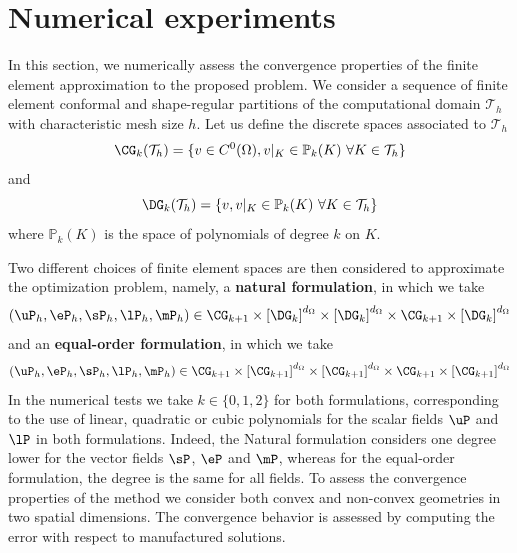\section{Numerical experiments}

In this section, we numerically assess the convergence properties of the finite element approximation to the proposed problem. We consider a sequence of finite element conformal and shape-regular partitions of the computational domain $\mathcal{T}_h$ with characteristic mesh size $h$. 
Let us define the discrete spaces associated to $\mathcal{T}_h$
$$
\CG_{k}(\mathcal{T}_h) = \{v \in C^0(\Omega), v|_K \in \mathbb{P}_k(K)~\forall K \in \mathcal{T}_h\}
$$
and 
$$
\DG_{k}(\mathcal{T}_h) = \{v, v|_K \in \mathbb{P}_k(K)~\forall K \in \mathcal{T}_h\}
$$
where $\mathbb{P}_k(K)$ is the space of polynomials of degree $k$ on $K$.

Two different choices of finite element spaces are then considered to approximate
the optimization problem, namely, a \textbf{natural formulation}, in which we take 
\begin{equation}\label{eq:natural_func_spaces}
	\left(\uP_{h}, \eP_{h}, \sP_{h}, \lP_{h}, \mP_{h}\right) \in \CG_{k+1} \times \left[\DG_{k}\right]^{d_{\Omega}} \times \left[\DG_{k}\right]^{d_{\Omega}} \times \CG_{k+1} \times \left[\DG_{k}\right]^{d_{\Omega}} 
\end{equation} 
and an \textbf{equal-order formulation}, in which we take
\begin{equation}\label{eq:equal_order_func_spaces}
\left(\uP_{h}, \eP_{h}, \sP_{h}, \lP_{h}, \mP_{h}\right)  \in \CG_{k+1} \times \left[\CG_{k+1}\right]^{d_{\Omega}} \times \left[\CG_{k+1}\right]^{d_{\Omega}} \times \CG_{k+1} \times \left[\CG_{k+1}\right]^{d_{\Omega}}
\end{equation}
In the numerical tests we take $k \in \{0, 1, 2\}$ for both formulations, corresponding to the use of linear, quadratic or cubic polynomials for the scalar fields $\uP$ and $\lP$ in both formulations. Indeed, the Natural formulation
considers one degree lower for the vector fields $\sP$, $\eP$ and $\mP$, whereas for the equal-order formulation, the degree is the same for all fields. 
To assess the convergence properties of the method we consider both convex and non-convex geometries in two spatial dimensions. The convergence behavior is assessed by computing the error with respect to manufactured solutions.

